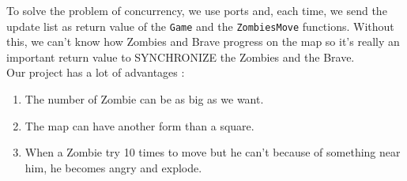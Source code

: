To solve the problem of concurrency, we use ports and, each time, we send the update list as return value of the \texttt{Game} and the \texttt{ZombiesMove} functions. Without this, we can't know how Zombies and Brave progress on the map so it's really an important return value to SYNCHRONIZE the Zombies and the Brave.\\

Our project has a lot of advantages :
\begin{enumerate}
\item The number of Zombie can be as big as we want.
\item The map can have another form than a square.
\item When a Zombie try 10 times to move but he can't because of something near him, he becomes angry and explode.
\end{enumerate}
